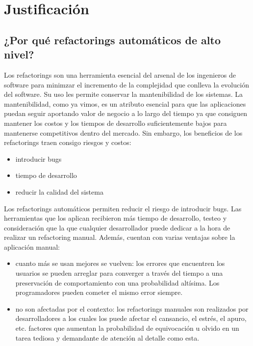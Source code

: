 \section{Justificación}

\subsection{¿Por qué refactorings automáticos de alto nivel?}
Los refactorings son una herramienta esencial del arsenal de los ingenieros de software para
minimzar el incremento de la complejidad que conlleva la evolución del software. Su uso les permite
conservar la mantenibilidad de los sistemas. La mantenibilidad, como ya vimos, es un atributo
esencial para que las aplicaciones puedan seguir aportando valor de negocio a lo largo del tiempo ya
que consiguen mantener los costos y los tiempos de desarrollo suficientemente bajos para mantenerse
competitivos dentro del mercado. Sin embargo, los beneficios de los refactorings traen consigo
riesgos y costos:

\begin{itemize}
    \item introducir bugs
    \item tiempo de desarrollo
    \item reducir la calidad del sistema
\end{itemize}

Los refactorings automáticos permiten reducir el riesgo de introducir bugs. Las herramientas que los
aplican recibieron más tiempo de desarrollo, testeo y consideración que la que cualquier
desarrollador puede dedicar a la hora de realizar un refactoring manual. Además, cuentan con varias
ventajas sobre la aplicación manual:

\begin{itemize}
    \item cuanto más se usan mejores se vuelven: los errores que encuentren los usuarios se pueden
    arreglar para converger a través del tiempo a una preservación de comportamiento con una
    probabilidad altísima. Los programadores pueden cometer el mismo error siempre.
    \item no son afectadas por el contexto: los refactorings manuales son realizados por
    desarrolladores a los cuales los puede afectar el cansancio, el estrés, el apuro, etc. factores
    que aumentan la probabilidad de equivocación u olvido en un tarea tediosa y demandante de
    atención al detalle como esta.
\end{itemize}

